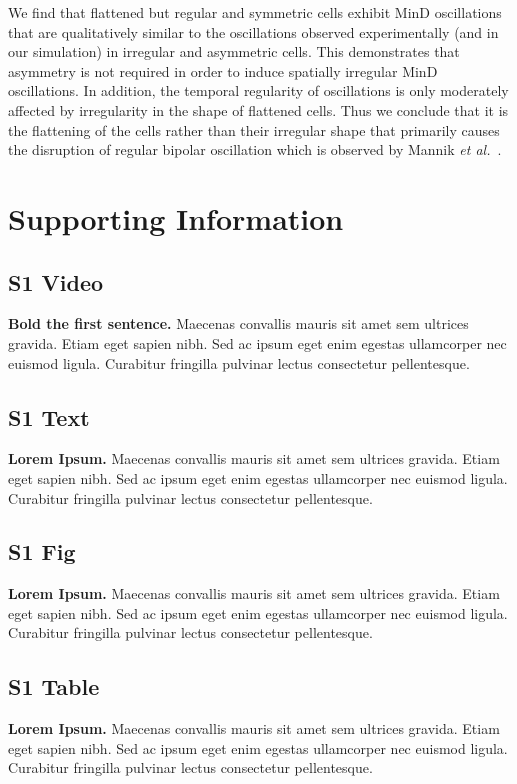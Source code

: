 \documentclass[10pt,letterpaper]{article}
\begin{document}
We find that flattened but regular and symmetric cells exhibit MinD
oscillations that are qualitatively similar to the oscillations
observed experimentally (and in our simulation) in irregular and
asymmetric cells.  This demonstrates that asymmetry is not required in
order to induce spatially irregular MinD oscillations.  In addition,
the temporal regularity of oscillations is only moderately affected by
irregularity in the shape of flattened cells.  Thus we conclude that
it is the flattening of the cells rather than their irregular shape
that primarily causes the disruption of regular bipolar oscillation
which is observed by Mannik \emph{et al.}~\cite{mannik2012robustness}.

\section*{Supporting Information}

\subsection*{S1 Video}
\label{S1_Video}
{\bf Bold the first sentence.}  Maecenas convallis mauris sit amet sem ultrices gravida. Etiam eget sapien nibh. Sed ac ipsum eget enim egestas ullamcorper nec euismod ligula. Curabitur fringilla pulvinar lectus consectetur pellentesque.

\subsection*{S1 Text}
\label{S1_Text}
{\bf Lorem Ipsum.} Maecenas convallis mauris sit amet sem ultrices gravida. Etiam eget sapien nibh. Sed ac ipsum eget enim egestas ullamcorper nec euismod ligula. Curabitur fringilla pulvinar lectus consectetur pellentesque.

\subsection*{S1 Fig}
\label{S1_Fig}
{\bf Lorem Ipsum.} Maecenas convallis mauris sit amet sem ultrices gravida. Etiam eget sapien nibh. Sed ac ipsum eget enim egestas ullamcorper nec euismod ligula. Curabitur fringilla pulvinar lectus consectetur pellentesque.

\subsection*{S1 Table}
\label{S1_Table}
{\bf Lorem Ipsum.} Maecenas convallis mauris sit amet sem ultrices gravida. Etiam eget sapien nibh. Sed ac ipsum eget enim egestas ullamcorper nec euismod ligula. Curabitur fringilla pulvinar lectus consectetur pellentesque.
\end{document}
